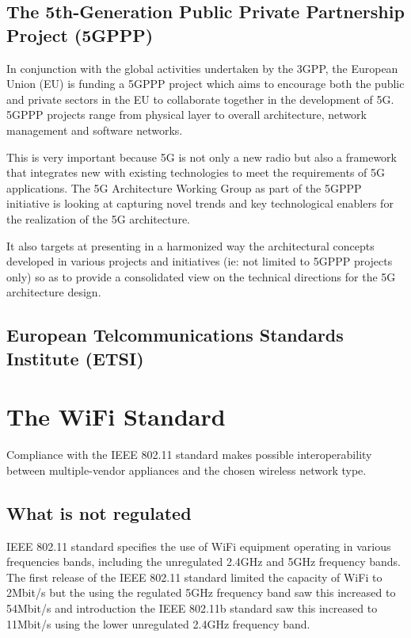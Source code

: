 \subsection{The 5th-Generation Public Private Partnership Project (5GPPP)}

In conjunction with the global activities undertaken by the 3GPP, the European Union (EU) is funding a 5GPPP project which aims to encourage both the public and private sectors in the EU to collaborate together in the development of 5G. 5GPPP projects range from physical layer to overall architecture, network management and software networks. 

This is very important because 5G is not only a new radio but also a framework that integrates new with existing technologies to meet the requirements of 5G applications. The 5G Architecture Working Group as part of the 5GPPP initiative is looking at capturing novel trends and key technological enablers for the realization of the 5G architecture. 

It also targets at presenting in a harmonized way the architectural concepts developed in various projects and initiatives (ie: not limited to 5GPPP projects only) so as to provide a consolidated view on the technical directions 
for the 5G architecture design.

\subsection{European Telcommunications Standards Institute (ETSI)}\label{ETSI}

\section{The WiFi Standard}

Compliance with the IEEE 802.11 standard makes possible interoperability between multiple-vendor appliances and the chosen wireless network type.

\subsection{What is not regulated}

IEEE 802.11 standard specifies the use of WiFi equipment operating in various frequencies bands, including the unregulated 2.4GHz and 5GHz frequency bands.  The first release of the IEEE 802.11 standard limited the capacity of WiFi to 2Mbit/s but the  using the regulated 5GHz frequency band saw this increased to 54Mbit/s and introduction the IEEE 802.11b standard saw this increased to 11Mbit/s using the lower unregulated 2.4GHz frequency band. 

